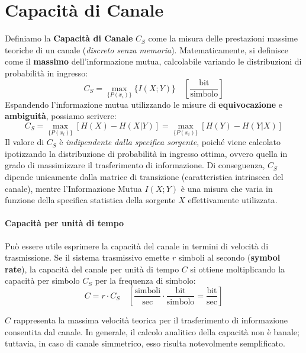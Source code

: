 \section{Capacità di Canale}
Definiamo la \textbf{Capacità di Canale} $C_S$ come la misura delle prestazioni massime teoriche di un canale (\textit{discreto senza memoria}).
Matematicamente, si definisce come il \textbf{massimo} dell'informazione mutua, calcolabile variando le distribuzioni di probabilità in ingresso:
\[
C_S = \max_{\{P(x_i)\}} \{I(X;Y)\} \quad \left[ \frac{\text{bit}}{\text{simbolo}} \right]
\]
Espandendo l'informazione mutua utilizzando le misure di \textbf{equivocazione} e \textbf{ambiguità}, possiamo scrivere:
\[
C_S = \max_{\{P(x_i)\}} [H(X) - H(X|Y)] = \max_{\{P(x_i)\}} [H(Y) - H(Y|X)]
\]
Il valore di $C_S$ è \textit{indipendente dalla specifica sorgente}, poiché viene calcolato ipotizzando la distribuzione di probabilità in ingresso ottima, ovvero quella in grado di massimizzare il trasferimento di informazione. Di conseguenza, $C_S$ dipende unicamente dalla matrice di transizione (caratteristica intrinseca del canale), mentre l'Informazione Mutua $I(X;Y)$ è una misura che varia in funzione della specifica statistica della sorgente $X$ effettivamente utilizzata.

\paragraph{Capacità per unità di tempo}
Può essere utile esprimere la capacità del canale in termini di velocità di trasmissione. Se il sistema trasmissivo emette $r$ simboli al secondo (\textbf{symbol rate}), la capacità del canale per unità di tempo $C$ si ottiene moltiplicando la capacità per simbolo $C_S$ per la frequenza di simbolo:
\[ C = r \cdot C_S \quad \left[ \frac{\text{simboli}}{\text{sec}} \cdot \frac{\text{bit}}{\text{simbolo}} = \frac{\text{bit}}{\text{sec}} \right] \]

$C$ rappresenta la massima velocità teorica per il trasferimento di informazione consentita dal canale. In generale, il calcolo analitico della capacità non è banale; tuttavia, in caso di canale simmetrico, esso risulta notevolmente semplificato.

